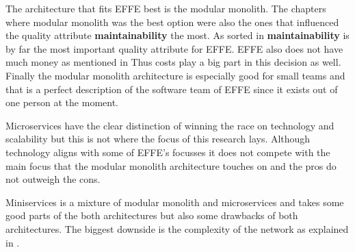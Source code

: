 The architecture that fits EFFE best is the modular monolith. The chapters where modular monolith was the best option were also the ones that influenced the quality attribute \textbf{maintainability} the most. As sorted in  \textbf{maintainability} is by far the most important quality attribute for EFFE. EFFE also does not have much money as mentioned in  Thus costs play a big part in this decision as well. Finally the modular monolith architecture is especially good for small teams and that is a perfect description of the software team of EFFE since it exists out of one person at the moment.

Microservices have the clear distinction of winning the race on technology and scalability but this is not where the focus of this research lays. Although technology aligns with some of EFFE's focusses it does not compete with the main focus that the modular monolith architecture touches on and the pros do not outweigh the cons.

Miniservices is a mixture of modular monolith and microservices and takes some good parts of the both architectures but also some drawbacks of both architectures. The biggest downside is the complexity of the network as explained in .
